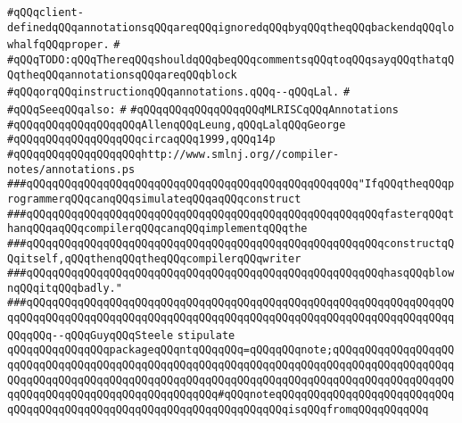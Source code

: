 \verb|#qQQqclient-definedqQQqannotationsqQQqareqQQqignoredqQQqbyqQQqtheqQQqbackendqQQqlowhalfqQQqproper.|\newline
\verb|#|\newline
\verb|#qQQqTODO:qQQqThereqQQqshouldqQQqbeqQQqcommentsqQQqtoqQQqsayqQQqthatqQQqtheqQQqannotationsqQQqareqQQqblock|\newline
\verb|#qQQqorqQQqinstructionqQQqannotations.qQQq--qQQqLal.|\newline
\verb|#|\newline
\verb|#qQQqSeeqQQqalso:|\newline
\verb|#|\newline
\verb|#qQQqqQQqqQQqqQQqqQQqMLRISCqQQqAnnotations|\newline
\verb|#qQQqqQQqqQQqqQQqqQQqAllenqQQqLeung,qQQqLalqQQqGeorge|\newline
\verb|#qQQqqQQqqQQqqQQqqQQqcircaqQQq1999,qQQq14p|\newline
\verb|#qQQqqQQqqQQqqQQqqQQqhttp://www.smlnj.org//compiler-notes/annotations.ps|\newline
\newline
\newline
\newline
\verb|###qQQqqQQqqQQqqQQqqQQqqQQqqQQqqQQqqQQqqQQqqQQqqQQqqQQq"IfqQQqtheqQQqprogrammerqQQqcanqQQqsimulateqQQqaqQQqconstruct|\newline
\verb|###qQQqqQQqqQQqqQQqqQQqqQQqqQQqqQQqqQQqqQQqqQQqqQQqqQQqqQQqfasterqQQqthanqQQqaqQQqcompilerqQQqcanqQQqimplementqQQqthe|\newline
\verb|###qQQqqQQqqQQqqQQqqQQqqQQqqQQqqQQqqQQqqQQqqQQqqQQqqQQqqQQqconstructqQQqitself,qQQqthenqQQqtheqQQqcompilerqQQqwriter|\newline
\verb|###qQQqqQQqqQQqqQQqqQQqqQQqqQQqqQQqqQQqqQQqqQQqqQQqqQQqqQQqhasqQQqblownqQQqitqQQqbadly."|\newline
\verb|###qQQqqQQqqQQqqQQqqQQqqQQqqQQqqQQqqQQqqQQqqQQqqQQqqQQqqQQqqQQqqQQqqQQqqQQqqQQqqQQqqQQqqQQqqQQqqQQqqQQqqQQqqQQqqQQqqQQqqQQqqQQqqQQqqQQqqQQqqQQqqQQq--qQQqGuyqQQqSteele|\newline
\newline
\newline
\newline
\verb|stipulate|\newline
\verb|qQQqqQQqqQQqqQQqpackageqQQqntqQQqqQQq=qQQqqQQqnote;qQQqqQQqqQQqqQQqqQQqqQQqqQQqqQQqqQQqqQQqqQQqqQQqqQQqqQQqqQQqqQQqqQQqqQQqqQQqqQQqqQQqqQQqqQQqqQQqqQQqqQQqqQQqqQQqqQQqqQQqqQQqqQQqqQQqqQQqqQQqqQQqqQQqqQQqqQQqqQQqqQQqqQQqqQQqqQQqqQQqqQQqqQQqqQQq#qQQqnoteqQQqqQQqqQQqqQQqqQQqqQQqqQQqqQQqqQQqqQQqqQQqqQQqqQQqqQQqqQQqqQQqqQQqqQQqisqQQqfromqQQqqQQqqQQq|\newline
